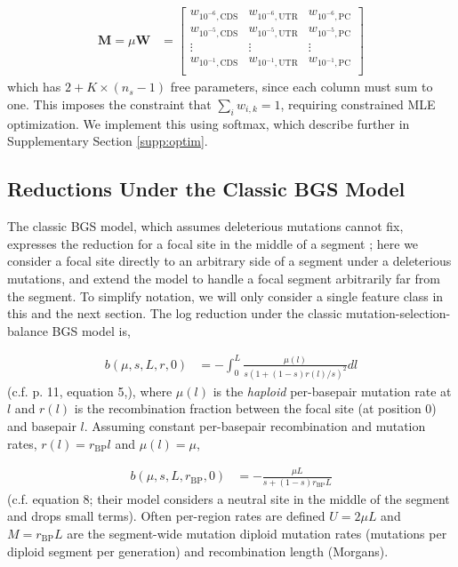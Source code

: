 \documentclass[11pt]{article}
\begin{document}
\begin{align}
    \mathbf{M} = \mu \mathbf{W} &= \begin{bmatrix} 
    w_{10^{-6},\text{CDS}} & w_{10^{-6},\text{UTR}} & w_{10^{-6},\text{PC}} \\
    w_{10^{-5},\text{CDS}} & w_{10^{-5},\text{UTR}} & w_{10^{-5},\text{PC}} \\
    \vdots & \vdots & \vdots \\
    w_{10^{-1},\text{CDS}} & w_{10^{-1},\text{UTR}} & w_{10^{-1},\text{PC}} \\
  \end{bmatrix}
\end{align}
%
which has $2 + K \times (n_s-1)$ free parameters, since each column must sum to
one. This imposes the constraint that $\sum_i w_{i,k} = 1$, requiring
constrained MLE optimization. We implement this using softmax, which describe 
further in Supplementary Section \ref{supp:optim}.

\subsection{Reductions Under the Classic BGS Model}
\label{supp:reduction-classic}

The classic BGS model, which assumes deleterious mutations cannot fix,
expresses the reduction for a focal site in the middle of a segment
\parencite{Hudson1995-xc,Hudson1994-oh,Nordborg1996-nq}; here we consider a
focal site directly to an arbitrary side of a segment under a deleterious
mutations, and extend the model to handle a focal segment arbitrarily far from
the segment. To simplify notation, we will only consider a single feature class
in this and the next section. The log reduction under the classic
mutation-selection-balance BGS model is,

\begin{align}
    \label{supp-eq:classic-b-int}
  b(\mu, s, L, r, 0) &=  - \int_0^L \frac{\mu(l)}{s (1 + (1-s) r(l)/s)^2} dl 
\end{align}
% 
(c.f. \cite{McVicker2009-ax} p. 11, \cite{Hudson1995-xc} equation 5,), where
$\mu(l)$ is the \emph{haploid} per-basepair mutation rate at $l$ and $r(l)$ is
the recombination fraction between the focal site (at position 0) and basepair
$l$. Assuming constant per-basepair recombination and mutation rates, $r(l) =
r_\text{BP}l$ and $\mu(l) = \mu$, 

\begin{align}
  b(\mu, s, L, r_\text{BP}, 0) &= - \frac{\mu L}{s + (1-s) r_\text{BP} L} 
\end{align}
%
(c.f. \cite{Hudson1995-xc} equation 8; their model considers a neutral site in
the middle of the segment and drops small terms). Often per-region rates are
defined $U = 2 \mu L$ and $M = r_\text{BP} L$ are the segment-wide mutation
diploid mutation rates (mutations per diploid segment per generation) and
recombination length (Morgans). 
\end{document}
